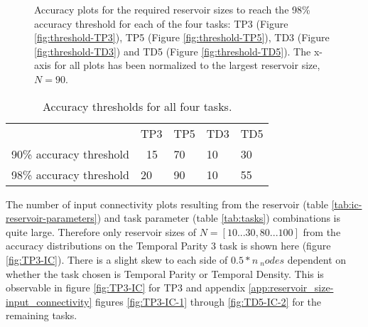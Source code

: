 \begin{figure}[ht]
    \centering
    \caption{
        Accuracy plots for the required reservoir sizes to reach the 98\% accuracy threshold for each of the four tasks:
        TP3 (Figure \ref{fig:threshold-TP3}), TP5 (Figure \ref{fig:threshold-TP5}), TD3 (Figure \ref{fig:threshold-TD3}) and TD5 (Figure \ref{fig:threshold-TD5}).
        The x-axis for all plots has been normalized to the largest reservoir size, $N=90$.
    }
    \label{fig:accuracy-threshold-size}
    \resizebox{\textwidth}{!}{
        \subfloat[TP3, N=20]{
            
            \label{fig:threshold-TP3}
        }
        \subfloat[TP5, N=90]{
            
            \label{fig:threshold-TP5}
        }
    }
    \resizebox{\textwidth}{!}{
        \subfloat[TD3, N=10]{
            
            \label{fig:threshold-TD3}
        }
        \subfloat[TD5, N=55]{
            
            \label{fig:threshold-TD5}
        }
    }
\end{figure}

\begin{table}[ht]
    \centering
    \caption{Accuracy thresholds for all four tasks.}
    \label{tab:accuracy-thresholds}
    \begin{tabular}{lllll}
                            & TP3 & TP5 & TD3 & TD5 \\
    90\% accuracy threshold & ~15 & 70  & 10  & 30  \\
    98\% accuracy threshold & 20  & 90  & 10  & 55
    \end{tabular}
\end{table}

The number of input connectivity plots resulting from the reservoir (table \ref{tab:ic-reservoir-parameters}) and task parameter (table \ref{tab:tasks}) combinations is quite large.
Therefore only reservoir sizes of $ N=[10...30, 80...100]$ from the accuracy distributions on the Temporal Parity 3 task is shown here (figure \ref{fig:TP3-IC}).
There is a slight skew to each side of $ 0.5 * n\ _nodes $ dependent on whether the task chosen is Temporal Parity or Temporal Density.
This is observable in figure \ref{fig:TP3-IC} for TP3 and appendix \ref{app:reservoir_size-input_connectivity} figures \ref{fig:TP3-IC-1} through \ref{fig:TD5-IC-2} for the remaining tasks.

